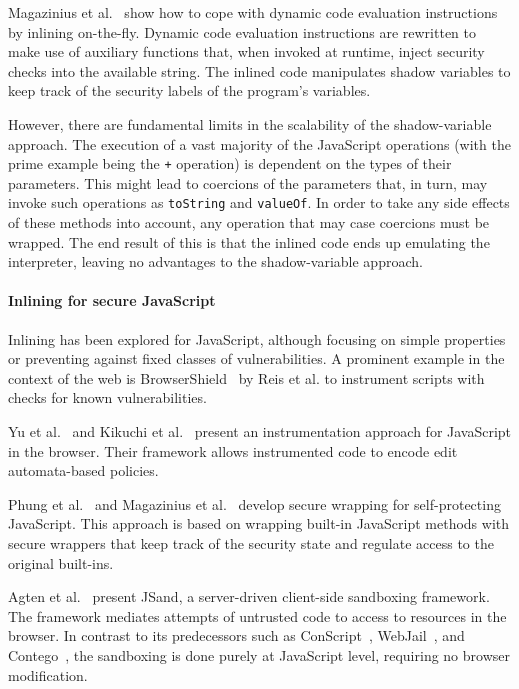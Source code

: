 \documentclass{llncs}
\begin{document}
Magazinius et
al.~\cite{Magazinius+:SEC10,DBLP:journals/compsec/MagaziniusRS12} show
how to cope with dynamic code evaluation instructions by inlining
on-the-fly. 
Dynamic code evaluation instructions are
rewritten to make use of auxiliary functions that, when invoked at
runtime, inject security checks into the available string. 
The inlined code manipulates shadow variables to keep track of the
security labels of the program's variables.

However, there are fundamental limits in the scalability of the shadow-variable
approach.  The execution of a vast majority of the JavaScript operations (with
the prime example being the \lstinline{+} operation) is dependent on the types
of their parameters.  This might lead to coercions of the parameters that, in
turn, may invoke such operations as \lstinline{toString} and \lstinline{valueOf}. In order to take
any side effects of these methods into account, any operation that may case
coercions must be wrapped. The end result of this is that the inlined code ends
up emulating the interpreter, leaving no advantages to the shadow-variable
approach.

\paragraph{Inlining for secure JavaScript}
Inlining has been explored for JavaScript, although focusing on
simple properties or preventing against fixed classes of vulnerabilities.
A prominent example in the context of the web is
BrowserShield~\cite{Reis+:TWeb07} by Reis et al. to instrument scripts with
checks for known vulnerabilities.

Yu et al.~\cite{Yu+:POPL07} and Kikuchi et
al.~\cite{DBLP:conf/aplas/2008} present an instrumentation approach
for JavaScript in the browser. Their framework allows instrumented
code to encode edit automata-based policies.

Phung et al.~\cite{DBLP:conf/ccs/PhungSC09} and 
Magazinius et al.~\cite{DBLP:conf/nordsec/MagaziniusPS10} develop
secure wrapping for self-protecting JavaScript. This approach is based
on wrapping built-in JavaScript methods with secure wrappers that
keep track of the security state and regulate access to the original built-ins.  



Agten et al.~\cite{DBLP:conf/acsac/AgtenABPDP12} present JSand, a
server-driven client-side sandboxing framework. The framework mediates
attempts of untrusted code to access to resources in the browser.  
In contrast to its predecessors such as
ConScript~\cite{DBLP:conf/sp/MeyerovichL10}, WebJail~\cite{DBLP:conf/acsac/AckerRDPJ11}, and Contego~\cite{DBLP:conf/trust/LuoD11},
the sandboxing is done purely at JavaScript level, requiring no
browser modification.
\end{document}

